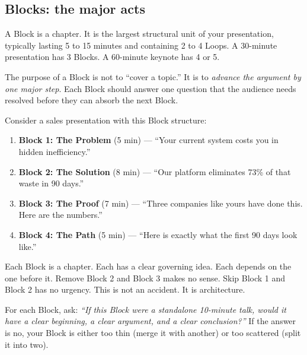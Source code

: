\subsection{Blocks: the major acts}

A Block is a chapter. It is the largest structural unit of your presentation, typically lasting 5 to 15 minutes and containing 2 to 4 Loops. A 30-minute presentation has 3 Blocks. A 60-minute keynote has 4 or 5.

The purpose of a Block is not to ``cover a topic.'' It is to \emph{advance the argument by one major step}. Each Block should answer one question that the audience needs resolved before they can absorb the next Block.

Consider a sales presentation with this Block structure:

\begin{enumerate}
  \item \textbf{Block 1: The Problem} (5 min) --- ``Your current system costs you  in hidden inefficiency.''
  \item \textbf{Block 2: The Solution} (8 min) --- ``Our platform eliminates 73\% of that waste in 90 days.''
  \item \textbf{Block 3: The Proof} (7 min) --- ``Three companies like yours have done this. Here are the numbers.''
  \item \textbf{Block 4: The Path} (5 min) --- ``Here is exactly what the first 90 days look like.''
\end{enumerate}

Each Block is a chapter. Each has a clear governing idea. Each depends on the one before it. Remove Block 2 and Block 3 makes no sense. Skip Block 1 and Block 2 has no urgency. This is not an accident. It is architecture.

\begin{keybox}
For each Block, ask: \emph{``If this Block were a standalone 10-minute talk, would it have a clear beginning, a clear argument, and a clear conclusion?''} If the answer is no, your Block is either too thin (merge it with another) or too scattered (split it into two).
\end{keybox}

